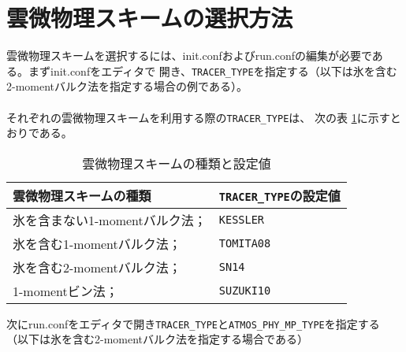 \section{雲微物理スキームの選択方法}
雲微物理スキームを選択するには、init.confおよびrun.confの編集が必要である。まずinit.confをエディタで
開き、\verb|TRACER_TYPE|を指定する（以下は氷を含む2-momentバルク法を指定する場合の例である）。\\

\\

それぞれの雲微物理スキームを利用する際の\verb|TRACER_TYPE|は、
次の表 \ref{tab:mp_trc_type}に示すとおりである。

\begin{table}[htb]
\begin{center}
\caption{雲微物理スキームの種類と設定値}
\begin{tabularx}{150mm}{|l|X|} \hline
 \rowcolor[gray]{0.9} 雲微物理スキームの種類 & \verb|TRACER_TYPE|の設定値 \\ \hline
 氷を含まない1-momentバルク法；\cite{kessler_1969}    & \verb|KESSLER| \\ \hline
 氷を含む1-momentバルク法；\cite{tomita_2008}         & \verb|TOMITA08| \\ \hline
 氷を含む2-momentバルク法；\cite{sn_2014}             & \verb|SN14| \\ \hline
 1-momentビン法；\cite{suzuki_etal_2010}             & \verb|SUZUKI10| \\ \hline
\end{tabularx}
\label{tab:mp_trc_type}
\end{center}
\end{table}

次にrun.confをエディタで開き\verb|TRACER_TYPE|と\verb|ATMOS_PHY_MP_TYPE|を指定する
（以下は氷を含む2-momentバルク法を指定する場合である）\\


